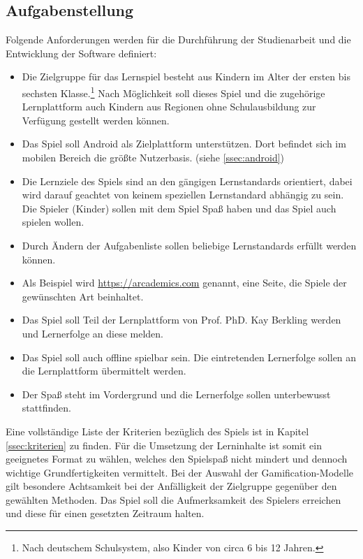 \subsection{Aufgabenstellung}
	Folgende Anforderungen werden für die Durchführung der Studienarbeit und die Entwicklung der Software definiert:
	\begin{itemize}
		\item{ Die Zielgruppe für das Lernspiel besteht aus Kindern im Alter der ersten bis sechsten Klasse.\footnote{Nach deutschem Schulsystem, also Kinder von circa 6 bis 12 Jahren.} Nach Möglichkeit soll dieses Spiel und die zugehörige Lernplattform auch Kindern aus Regionen ohne Schulausbildung zur Verfügung gestellt werden können. }
		\item{ Das Spiel soll Android als Zielplattform unterstützen. Dort befindet sich im mobilen Bereich die größte Nutzerbasis. (siehe \ref{ssec:android}) }
		\item{ Die Lernziele des Spiels sind an den gängigen Lernstandards orientiert, dabei wird darauf geachtet von keinem speziellen Lernstandard abhängig zu sein. Die Spieler (Kinder) sollen mit dem Spiel Spaß haben und das Spiel auch spielen wollen. }
		\item{ Durch Ändern der Aufgabenliste sollen beliebige Lernstandards erfüllt werden können. }
		\item{ Als Beispiel wird \url{https://arcademics.com} genannt, eine Seite, die Spiele der gewünschten Art beinhaltet. }
		\item{ Das Spiel soll Teil der Lernplattform von Prof. PhD. Kay Berkling werden und Lernerfolge an diese melden. }
		\item{ Das Spiel soll auch offline spielbar sein. Die eintretenden Lernerfolge sollen an die Lernplattform übermittelt werden. }
		\item{ Der Spaß steht im Vordergrund und die Lernerfolge sollen unterbewusst stattfinden. }
	\end{itemize}
	Eine vollständige Liste der Kriterien bezüglich des Spiels ist in Kapitel \ref{ssec:kriterien} zu finden.
	Für die Umsetzung der Lerninhalte ist somit ein geeignetes Format zu wählen, welches den Spielspaß nicht mindert und dennoch wichtige Grundfertigkeiten vermittelt.
	Bei der Auswahl der Gamification-Modelle gilt besondere Achtsamkeit bei der Anfälligkeit der Zielgruppe gegenüber den gewählten Methoden. Das Spiel soll die Aufmerksamkeit des Spielers erreichen und diese für einen gesetzten Zeitraum halten.

